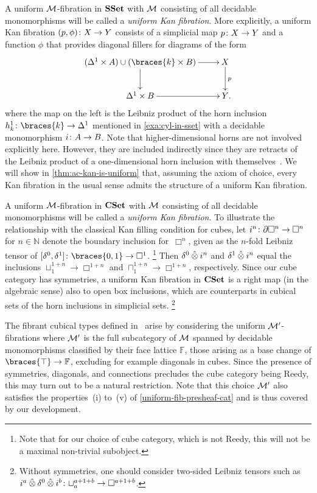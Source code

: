 \documentclass[reqno,10pt,a4paper,oneside,draft]{amsart}
\begin{document}
\begin{example}
A uniform $\cal{M}$-fibration in $\SSet$ with $\cal{M}$ consisting of all decidable monomorphisms will be called a \emph{uniform Kan fibration}.
More explicitly, a uniform Kan fibration $(p, \phi) \co X \to Y$ consists of a simplicial map $p \co X \to Y$ and a function $\phi$ that provides diagonal fillers for diagrams of the form
\[
\xymatrix{
  (\Delta^1 \times A) \cup (\braces{k} \times B)
  \ar[r]
  \ar[d]
&
  X
  \ar[d]^{p}
\\
  \Delta^1 \times B
  \ar[r]
&
  Y
\rlap{.}}
\]
where the map on the left is the Leibniz product of the horn inclusion $h_k^1 \co \braces{k} \to \Delta^1$ mentioned in \cref{exa:cyl-in-sset} with a decidable monomorphism $i \co A \to B$.
Note that higher-dimensional horns are not involved explicitly here.
However, they are included indirectly since they are retracts of the Leibniz product of a one-dimensional horn inclusion with themselves~\cite[Chap.~IV, Sec.~2]{gabriel-zisman:calculus-of-fractions}.
We will show in \cref{thm:ac-kan-is-uniform} that, assuming the axiom of choice, every Kan fibration in the usual sense admits the structure of a uniform Kan fibration.
\end{example}

\begin{example}
A uniform $\cal{M}$-fibration in $\CSet$ with $\cal{M}$ consisting of all decidable monomorphisms will be called a \emph{uniform Kan fibration}.
To illustrate the relationship with the classical Kan filling condition for cubes, let $i^n \co \partial \Box^n \to \Box^n$ for $n \in \mathbb{N}$ denote the boundary inclusion for~$\Box^n$, given as the $n$-fold Leibniz tensor of $[\lcyl, \rcyl] \co \braces{0, 1} \to \Box^1$.%
\footnote{Note that for our choice of cube category, which is not Reedy, this will not be a maximal non-trivial subobject.}
Then $\lcyl \hatotimes i^n$ and $\rcyl \hatotimes i^n$ equal the inclusions $\sqcup_1^{1+n} \to \Box^{1+n}$ and $\sqcap_1^{1+n} \to \Box^{1+n}$, respectively.
Since our cube category has symmetries, a uniform Kan fibration in $\CSet$ is a right map (in the algebraic sense) also to open box inclusions, which are
counterparts in cubical sets of the horn inclusions in simplicial sets.%
\footnote{Without symmetries, one should consider two-sided Leibniz tensors such as $i^a \hatotimes \lcyl \hatotimes i^b \co \sqcup_a^{a+1+b} \to \Box^{a+1+b}$.}

The fibrant cubical types defined in~\cite{cohen-et-al:cubicaltt} arise by considering the uniform $\cal{M}'$-fibrations where $\cal{M}'$ is the full subcategory of $\cal{M}$ spanned by decidable monomorphisms classified by their face lattice $\mathbb{F}$, \ie those arising as a base change of $\braces{\top} \to \mathbb{F}$, excluding for example diagonals in cubes.
Since the presence of symmetries, diagonals, and connections precludes the cube category being Reedy, this may turn out to be a natural restriction.
Note that this choice $\cal{M}'$ also satisfies the properties~(i) to~(v) of \cref{uniform-fib-presheaf-cat} and is thus covered by our development.
\end{example}
\end{document}
